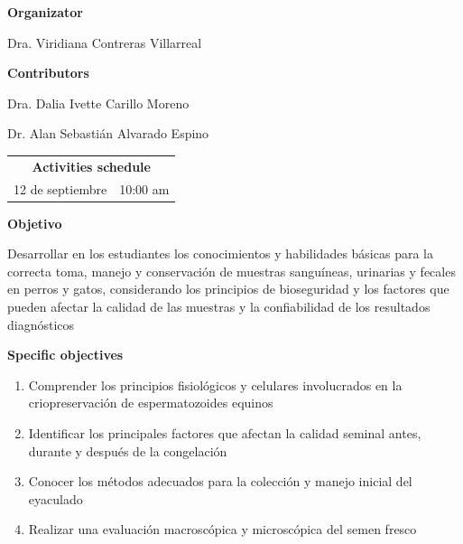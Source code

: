 \maketitle

\begin{minipage}{0.45\textwidth}
	\centering
	\textbf{Organizator}
	
	Dra. Viridiana Contreras Villarreal
	
\end{minipage}%
\hfil%
\begin{minipage}{0.45\textwidth}
	\centering
	\textbf{Contributors}
	
	Dra. Dalia Ivette Carillo Moreno
	
	Dr. Alan Sebastián Alvarado Espino
	
\end{minipage}

\begin{table}[H]
	\centering
	\begin{tabular}{l|c}
		\multicolumn{2}{c}{\textbf{Activities schedule}} \\
		12 de septiembre & 10:00 am
	\end{tabular}
\end{table}

\begin{center}
	\vspace{-.32cm}
	\textbf{Objetivo}
	\vspace{-.32cm}
\end{center}
\justify
Desarrollar en los estudiantes los conocimientos y habilidades básicas para la correcta toma, manejo y conservación de muestras sanguíneas, urinarias y fecales en perros y gatos, considerando los principios de bioseguridad y los factores que pueden afectar la calidad de las muestras y la confiabilidad de los resultados diagnósticos

\begin{center}
	\vspace{-.32cm}
	\textbf{Specific objectives}
	\vspace{-.32cm}
\end{center}
\begin{enumerate}
	\setlength\itemsep{-4pt}
	\item Comprender los principios fisiológicos y celulares involucrados en la criopreservación de espermatozoides equinos
	\item Identificar los principales factores que afectan la calidad seminal antes, durante y después de la congelación
	\item Conocer los métodos adecuados para la colección y manejo inicial del eyaculado
	\item Realizar una evaluación macroscópica y microscópica del semen fresco
\end{enumerate}

